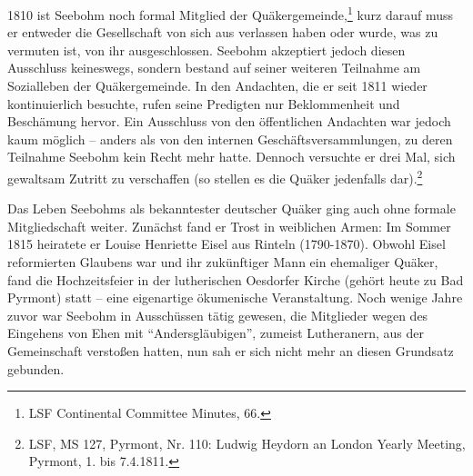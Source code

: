 1810 ist Seebohm noch formal Mitglied der Quäkergemeinde,\footnote{LSF
Continental Committee Minutes, 66.} kurz darauf muss er entweder die
Gesellschaft von sich aus verlassen haben oder wurde, was zu vermuten ist, von
ihr ausgeschlossen. Seebohm akzeptiert jedoch diesen Ausschluss keineswegs,
sondern bestand auf seiner weiteren Teilnahme am Sozialleben der Quäkergemeinde.
In den Andachten, die er seit 1811 wieder kontinuierlich besuchte, rufen seine
Predigten nur Beklommenheit und Beschämung hervor. Ein Ausschluss von den
öffentlichen Andachten war jedoch kaum möglich -- anders als von den internen
Geschäftsversammlungen, zu deren Teilnahme Seebohm kein Recht mehr hatte.
Dennoch versuchte er drei Mal, sich gewaltsam Zutritt zu verschaffen (so stellen
es die Quäker jedenfalls dar).\footnote{LSF, MS 127, Pyrmont, Nr. 110: Ludwig
Heydorn an London Yearly Meeting,
Pyrmont, 1. bis 7.4.1811.}

\medskip

Das Leben Seebohms als bekanntester deutscher Quäker ging auch ohne formale
Mitgliedschaft weiter. Zunächst fand er Trost in weiblichen Armen: Im Sommer
1815 heiratete er Louise Henriette Eisel aus Rinteln (1790-1870). Obwohl Eisel
reformierten Glaubens war und ihr zukünftiger Mann ein ehemaliger Quäker, fand
die Hochzeitsfeier in der lutherischen Oesdorfer Kirche (gehört heute zu Bad
Pyrmont) statt -- eine eigenartige ökumenische Veranstaltung. Noch wenige Jahre
zuvor war Seebohm in Ausschüssen tätig gewesen, die Mitglieder wegen des
Eingehens von Ehen mit "`Andersgläubigen"', zumeist Lutheranern, aus der
Gemeinschaft verstoßen hatten, nun sah er sich nicht mehr an diesen Grundsatz
gebunden.

\medskip

